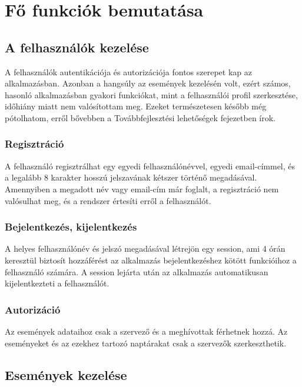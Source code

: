 \documentclass[a4paper,12pt]{report}
\theoremstyle{definition}
\theoremstyle{remark}
\begin{document}
\chapter{Fő funkciók bemutatása}

\section{A felhasználók kezelése}

A felhasználók autentikációja és autorizációja fontos szerepet kap az alkalmazásban. Azonban a hangsúly az események kezelésén volt, ezért számos, hasonló alkalmazásban gyakori funkciókat, mint a felhasználói profil szerkesztése, időhiány miatt nem valósítottam meg. Ezeket természetesen később még pótolhatom, erről bővebben a Továbbfejlesztési lehetőségek fejezetben írok.

	\subsection{Regisztráció}

A felhasználó regisztrálhat egy egyedi felhasználónévvel, egyedi email-címmel, és a legalább 8 karakter hosszú jelszavának kétszer történő megadásával. Amennyiben a megadott név vagy email-cím már foglalt, a regisztráció nem valósulhat meg, és a rendszer értesíti erről a felhasználót.

	\subsection{Bejelentkezés, kijelentkezés}

A helyes felhasználónév és jelszó megadásával létrejön egy session, ami 4 órán keresztül biztosít hozzáférést az alkalmazás bejelentkezéshez kötött funkcióihoz a felhasználó számára. A session lejárta után az alkalmazás automatikusan kijelentkezteti a felhasználót.

	\subsection{Autorizáció}

Az események adataihoz csak a szervező és a meghívottak férhetnek hozzá. Az eseményeket és az ezekhez tartozó naptárakat csak a szervezők szerkeszthetik.

\section{Események kezelése}
\end{document}
